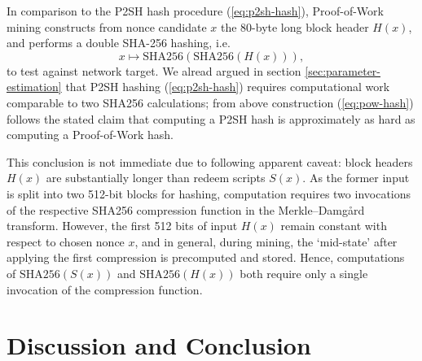 \documentclass[10pt,a4paper,twocolumn]{article}
\begin{document}
In comparison to the P2SH hash procedure (\ref{eq:p2sh-hash}), Proof-of-Work mining constructs from nonce candidate $x$ the 80-byte long block header $H(x)$, and performs a double SHA-256 hashing, i.e. 
\begin{equation}
    x \mapsto \text{{SHA256}}(\text{{SHA256}}(H(x))),\label{eq:pow-hash}
\end{equation}
to test against network target.
We alread argued in section \ref{sec:parameter-estimation} that P2SH hashing (\ref{eq:p2sh-hash}) requires computational work comparable to two SHA256 calculations; from above construction (\ref{eq:pow-hash}) follows the stated claim that computing a P2SH hash is approximately as hard as computing a Proof-of-Work hash.

This conclusion is not immediate due to following apparent caveat: block headers $H(x)$ are substantially longer than redeem scripts $S(x)$.
As the former input is split into two 512-bit blocks for hashing, computation requires two invocations of the respective {SHA256} compression function in the Merkle–Damgård transform.
However, the first 512 bits of input $H(x)$ remain constant with respect to chosen nonce $x$, and in general, during mining, the \enquote*{mid-state} after applying the first compression is precomputed and stored.
Hence, computations of $\text{{SHA256}}(S(x))$ and $\text{{SHA256}}(H(x))$ both require only a single invocation of the compression function.


\section{Discussion and Conclusion}

\end{document}
